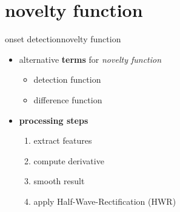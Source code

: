    \section{novelty function}
        \begin{frame}{onset detection}{novelty function}
            \begin{itemize}
                \item	alternative \textbf{terms} for \textit{novelty function}
                    \begin{itemize}
                        \item	detection function
                        \item	difference function
                    \end{itemize}
                \bigskip
                \item<1->	\textbf{processing steps}
                    \begin{enumerate}
                        \item<2->	extract features
                        \item<3->	compute derivative
                        \item<4->	smooth result
                        \item<5->	apply Half-Wave-Rectification (HWR)
                    \end{enumerate}
            \end{itemize}
        \end{frame}
